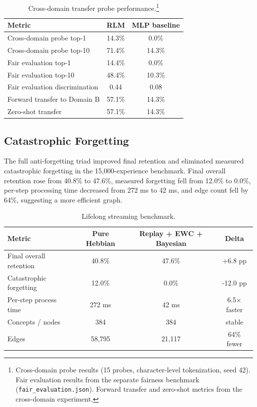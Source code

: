 \documentclass[11pt]{article}
\begin{document}
\begin{table}[h]
\centering
\caption{Cross-domain transfer probe performance.\footnote{Cross-domain probe results (15 probes, character-level tokenization, seed 42). Fair evaluation results from the separate fairness benchmark (\texttt{fair\_evaluation.json}). Forward transfer and zero-shot metrics from the cross-domain experiment.}}
\begin{tabular}{lcc}
\toprule
Metric & RLM & MLP baseline \\
\midrule
Cross-domain probe top-1 & 14.3\% & 0.0\% \\
Cross-domain probe top-10 & 71.4\% & 14.3\% \\
Fair evaluation top-1 & 14.4\% & 0.0\% \\
Fair evaluation top-10 & 48.4\% & 10.3\% \\
Fair evaluation discrimination & 0.44 & 0.08 \\
Forward transfer to Domain B & 57.1\% & 14.3\% \\
Zero-shot transfer & 57.1\% & 14.3\% \\
\bottomrule
\end{tabular}
\end{table}

\subsection{Catastrophic Forgetting}
The full anti-forgetting triad improved final retention and eliminated measured catastrophic forgetting in the 15,000-experience benchmark. Final overall retention rose from 40.8\% to 47.6\%, measured forgetting fell from 12.0\% to 0.0\%, per-step processing time decreased from 272 ms to 42 ms, and edge count fell by 64\%, suggesting a more efficient graph.

\begin{table}[h]
\centering
\caption{Lifelong streaming benchmark.}
\label{tab:lifelong}
\begin{tabular}{lccc}
\toprule
Metric & Pure Hebbian & Replay + EWC + Bayesian & Delta \\
\midrule
Final overall retention & 40.8\% & 47.6\% & +6.8 pp \\
Catastrophic forgetting & 12.0\% & 0.0\% & -12.0 pp \\
Per-step process time & 272 ms & 42 ms & 6.5$\times$ faster \\
Concepts / nodes & 384 & 384 & stable \\
Edges & 58,795 & 21,117 & 64\% fewer \\
\bottomrule
\end{tabular}
\end{table}
\end{document}
